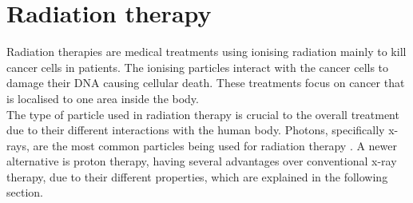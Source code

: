 %
%

\chapter{Radiation therapy}
Radiation therapies are medical treatments using ionising radiation mainly to kill cancer cells in patients. The ionising particles interact with the
cancer cells to damage their DNA causing cellular death. These treatments focus on cancer that is localised to one area inside the body. \\
The type of particle used in radiation therapy is crucial to the overall treatment due to their different interactions with the human body.
Photons, specifically x-rays, are the most common particles being used for radiation therapy \cite{most_common}.
A newer alternative is proton therapy, having several advantages over conventional x-ray therapy, due to their different properties, which are explained in the following section.


